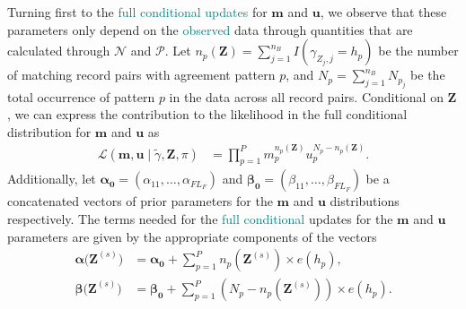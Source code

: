 \documentclass[ba]{imsart}
\begin{document}
Turning first to the \textcolor{teal}{full conditional updates}
for $\bm{m}$ and $\bm{u}$, we observe that these parameters only depend on the \textcolor{teal}{observed} data  through quantities that are calculated through $\mathcal{N}$ and $\mathcal{P}$. Let $n_p(\bm{Z}) = \sum_{j=1}^{n_B} I\left(\gamma_{Z_j, j} = h_p \right)$ be the number of matching record pairs with agreement pattern $p$, and $N_p = \sum_{j=1}^{n_B} N_{p_j}$ be the total occurrence of pattern $p$ in the data across all record pairs. Conditional on $\bm{Z}$, we can express the contribution to the likelihood in the full conditional distribution for $\bm{m}$ and $\bm{u}$ as
\begin{align}
	\mathcal{L}(\bm{m}, \bm{u} \mid \tilde{\gamma}, \bm{Z}, \pi)  &=  \prod_{p=1}^P m_p^{n_p(\bm{Z})}u_p^{N_p - n_p(\bm{Z})}  \label{likelihood_efficient_m_u}.
\end{align}
Additionally, let $\bm{\alpha_0} = (\alpha_{11}, \ldots, \alpha_{F L_F})$ and $\bm{\beta_0}= (\beta_{11}, \ldots, \beta_{F L_F})$ be a concatenated vectors of prior parameters for the $\bm{m}$ and $\bm{u}$ distributions respectively. The terms needed for the \textcolor{teal}{full conditional} updates for the $\bm{m}$ and $\bm{u}$ parameters are given by the appropriate components of the vectors
\begin{subequations}
	\begin{align}
		\bm{\alpha(Z}^{(s)}\bm{)} &= \bm{\alpha_0} + \sum_{p=1}^P n_p\left(\bm{Z}^{(s)}\right) \times e(h_p), \label{efficient_alpha} \\
		\bm{\beta(Z}^{(s)}\bm{)} &= \bm{\beta_0} + \sum_{p=1}^P \left(N_p - n_p\left(\bm{Z}^{(s)}\right)\right) \times e(h_p). \label{efficient_beta}
	\end{align}
\end{subequations}

\end{document}
